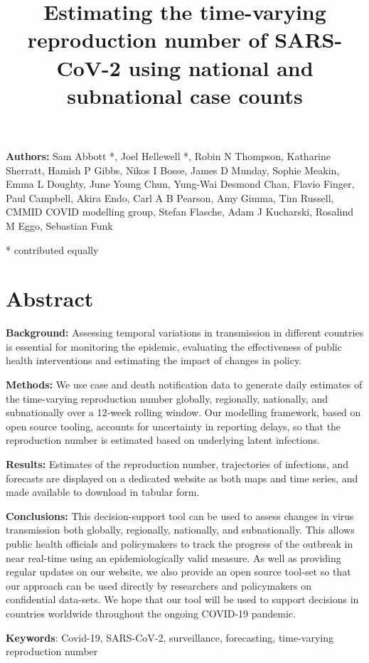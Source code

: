 \documentclass[
]{article}
\title{Estimating the time-varying reproduction number of SARS-CoV-2 using
national and subnational case counts}
\author{}
\date{\vspace{-2.5em}}
\begin{document}
\maketitle

\textbf{Authors:} Sam Abbott *, Joel Hellewell *, Robin N Thompson,
Katharine Sherratt, Hamish P Gibbs, Nikos I Bosse, James D Munday,
Sophie Meakin, Emma L Doughty, June Young Chun, Yung-Wai Desmond Chan,
Flavio Finger, Paul Campbell, Akira Endo, Carl A B Pearson, Amy Gimma,
Tim Russell, CMMID COVID modelling group, Stefan Flasche, Adam J
Kucharski, Rosalind M Eggo, Sebastian Funk

* contributed equally

\hypertarget{abstract}{%
\section{Abstract}\label{abstract}}

\textbf{Background:} Assessing temporal variations in transmission in
different countries is essential for monitoring the epidemic, evaluating
the effectiveness of public health interventions and estimating the
impact of changes in policy.

\textbf{Methods:} We use case and death notification data to generate
daily estimates of the time-varying reproduction number globally,
regionally, nationally, and subnationally over a 12-week rolling window.
Our modelling framework, based on open source tooling, accounts for
uncertainty in reporting delays, so that the reproduction number is
estimated based on underlying latent infections.

\textbf{Results:} Estimates of the reproduction number, trajectories of
infections, and forecasts are displayed on a dedicated website as both
maps and time series, and made available to download in tabular form.

\textbf{Conclusions:} This decision-support tool can be used to assess
changes in virus transmission both globally, regionally, nationally, and
subnationally. This allows public health officials and policymakers to
track the progress of the outbreak in near real-time using an
epidemiologically valid measure. As well as providing regular updates on
our website, we also provide an open source tool-set so that our
approach can be used directly by researchers and policymakers on
confidential data-sets. We hope that our tool will be used to support
decisions in countries worldwide throughout the ongoing COVID-19
pandemic.

\textbf{Keywords}: Covid-19, SARS-CoV-2, surveillance, forecasting,
time-varying reproduction number
\end{document}
